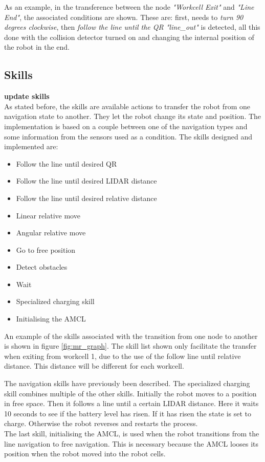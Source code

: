     As an example, in the transference between the node \emph{"Workcell Exit"} and \emph{"Line End"}, the associated conditions are shown. 
    These are: first, needs to \emph{turn 90 degrees clockwise}, then \emph{follow the line until the QR "line\_out"} is detected, all this done with the collision detector turned on and changing the internal position of the robot in the end.

    \subsection{Skills} %
    \label{sub:skills}
    \textbf{update skills}\\
    As stated before, the skills are available actions to transfer the robot from one navigation state to another. They let the robot change its state and position.
    The implementation is based on a couple between one of the navigation types and some information from the sensors used as a condition.
    The skills designed and implemented are:
    \begin{itemize}
        \item Follow the line until desired QR
        \item Follow the line until desired LIDAR distance
        \item Follow the line until desired relative distance
        \item Linear relative move
        \item Angular relative move
        \item Go to free position
        \item Detect obstacles
        \item Wait
        \item Specialized charging skill
        \item Initialising the AMCL 
    \end{itemize}    
	An example of the skills associated with the transition from one node to another is shown in figure \ref{fig:mr_graph}. The skill list shown only facilitate the transfer when exiting from workcell 1, due to the use of the follow line until relative distance. This distance will be different for each workcell.

The navigation skills have previously been described. The specialized charging skill combines multiple of the other skills. Initially the robot moves to a position in free space. Then it follows a line until a certain LIDAR distance. Here it waits 10 seconds to see if the battery level has risen. If it has risen the state is set to charge. Otherwise the robot reverses and restarts the process. \\
The last skill, initialising the AMCL, is used when the robot transitions from the line navigation to free navigation. This is necessary because the AMCL looses its position when the robot moved into the robot cells.
	
